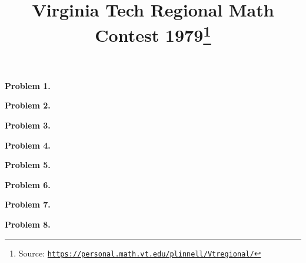 \documentclass[10pt]{article}
\newcommand{\vtrmc}{https://personal.math.vt.edu/plinnell/Vtregional/}
\newcommand{\source}{\href{\vtrmc}{\texttt{\vtrmc}}}
\newcommand{\problem}[1]{\textbf{Problem #1.}}
\begin{document}
\title{Virginia Tech Regional Math Contest 1979\footnote{Source: \source}}
\author{\vspace{-2ex}}
\date{\vspace{-6ex}} %
\maketitle

\problem{1}


\problem{2}


\problem{3}


\problem{4}


\problem{5}


\problem{6}


\problem{7}


\problem{8}

\end{document}
